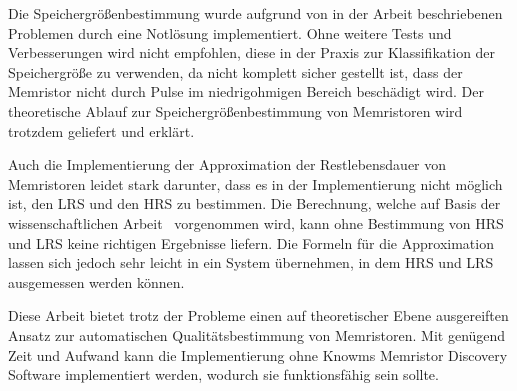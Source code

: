 Die Speichergrößenbestimmung wurde aufgrund von in der Arbeit beschriebenen Problemen durch eine Notlösung implementiert. Ohne weitere Tests und Verbesserungen wird  nicht empfohlen, diese in der Praxis zur Klassifikation der Speichergröße zu verwenden, da nicht komplett sicher gestellt ist, dass der Memristor nicht durch Pulse im niedrigohmigen Bereich beschädigt wird. Der theoretische Ablauf zur Speichergrößenbestimmung von Memristoren wird trotzdem geliefert und erklärt.

Auch die Implementierung der Approximation der Restlebensdauer von Memristoren leidet stark darunter, dass es in der Implementierung nicht möglich ist, den LRS und den HRS zu bestimmen. Die Berechnung, welche auf Basis der wissenschaftlichen Arbeit~\cite{stat_lifetime} vorgenommen wird, kann ohne Bestimmung von HRS und LRS keine richtigen Ergebnisse liefern. Die Formeln für die Approximation lassen sich jedoch sehr leicht in ein System übernehmen, in dem HRS und LRS ausgemessen werden können.

Diese Arbeit bietet trotz der Probleme einen auf theoretischer Ebene ausgereiften Ansatz zur automatischen Qualitätsbestimmung von Memristoren. Mit genügend Zeit und Aufwand kann die Implementierung ohne Knowms Memristor Discovery Software implementiert werden, wodurch sie funktionsfähig sein sollte.
